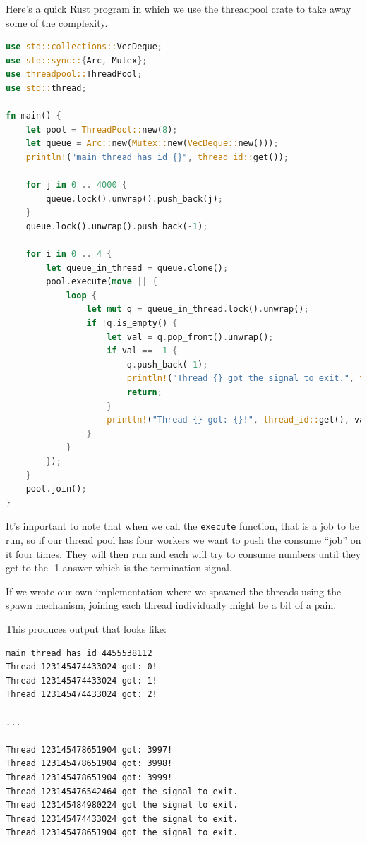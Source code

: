 \documentclass[a4paper]{report}
\begin{document}
Here's a quick Rust program in which we use the threadpool crate to take away some of the complexity.
\begin{lstlisting}[language=Rust]
use std::collections::VecDeque;
use std::sync::{Arc, Mutex};
use threadpool::ThreadPool;
use std::thread;

fn main() {
    let pool = ThreadPool::new(8);
    let queue = Arc::new(Mutex::new(VecDeque::new()));
    println!("main thread has id {}", thread_id::get());

    for j in 0 .. 4000 {
        queue.lock().unwrap().push_back(j);
    }
    queue.lock().unwrap().push_back(-1);

    for i in 0 .. 4 {
        let queue_in_thread = queue.clone();
        pool.execute(move || {
            loop {
                let mut q = queue_in_thread.lock().unwrap();
                if !q.is_empty() {
                    let val = q.pop_front().unwrap();
                    if val == -1 {
                        q.push_back(-1);
                        println!("Thread {} got the signal to exit.", thread_id::get());
                        return;
                    }
                    println!("Thread {} got: {}!", thread_id::get(), val);
                }
            }
        });
    }
    pool.join();
}
\end{lstlisting}

It's important to note that when we call the \texttt{execute} function, that is a job to be run, so if our thread pool has four workers we want to push the consume ``job'' on it four times. They will then run and each will try to consume numbers until they get to the -1 answer which is the termination signal.

If we wrote our own implementation where we spawned the threads using the spawn mechanism, joining each thread individually might be a bit of a pain. 

This produces output that looks like:

\begin{verbatim}
main thread has id 4455538112
Thread 123145474433024 got: 0!
Thread 123145474433024 got: 1!
Thread 123145474433024 got: 2!

...

Thread 123145478651904 got: 3997!
Thread 123145478651904 got: 3998!
Thread 123145478651904 got: 3999!
Thread 123145476542464 got the signal to exit.
Thread 123145484980224 got the signal to exit.
Thread 123145474433024 got the signal to exit.
Thread 123145478651904 got the signal to exit.
\end{verbatim}
\end{document}
